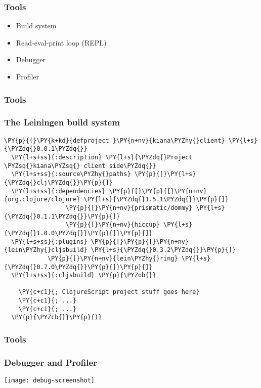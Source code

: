 \begin{frame}
  \frametitle{Tools}


  \begin{itemize}
  \item<1-> Build system
  \item<2-> Read-eval-print loop (REPL)
  \item<3-> Debugger
  \item<4-> Profiler
  \end{itemize}

\end{frame}



\begin{frame}[fragile]
  \frametitle{Tools}
  \frametitle{The Leiningen build system}

\begin{Verbatim}[commandchars=\\\{\}]
\PY{p}{(}\PY{k+kd}{defproject }\PY{n+nv}{kiana\PYZhy{}client} \PY{l+s}{\PYZdq{}0.0.1\PYZdq{}}
  \PY{l+s+ss}{:description} \PY{l+s}{\PYZdq{}Project \PYZsq{}kiana\PYZsq{} client side\PYZdq{}}
  \PY{l+s+ss}{:source\PYZhy{}paths} \PY{p}{[}\PY{l+s}{\PYZdq{}clj\PYZdq{}}\PY{p}{]}
  \PY{l+s+ss}{:dependencies} \PY{p}{[}\PY{p}{[}\PY{n+nv}{org.clojure/clojure} \PY{l+s}{\PYZdq{}1.5.1\PYZdq{}}\PY{p}{]}
                 \PY{p}{[}\PY{n+nv}{prismatic/dommy} \PY{l+s}{\PYZdq{}0.1.1\PYZdq{}}\PY{p}{]}
                 \PY{p}{[}\PY{n+nv}{hiccup} \PY{l+s}{\PYZdq{}1.0.0\PYZdq{}}\PY{p}{]}\PY{p}{]}
  \PY{l+s+ss}{:plugins} \PY{p}{[}\PY{p}{[}\PY{n+nv}{lein\PYZhy{}cljsbuild} \PY{l+s}{\PYZdq{}0.3.2\PYZdq{}}\PY{p}{]}
            \PY{p}{[}\PY{n+nv}{lein\PYZhy{}ring} \PY{l+s}{\PYZdq{}0.7.0\PYZdq{}}\PY{p}{]}\PY{p}{]}
  \PY{l+s+ss}{:cljsbuild} \PY{p}{\PYZob{}}

    \PY{c+c1}{; ClojureScript project stuff goes here}
    \PY{c+c1}{; ...}
    \PY{c+c1}{; ...}
  \PY{p}{\PYZcb{}}\PY{p}{)}
\end{Verbatim}

\end{frame}



\begin{frame}[fragile]
  \frametitle{Tools}
  \frametitle{Debugger and Profiler}

  \begin{center}
      {\texttt{[image: debug-screenshot]}}
  \end{center}

\end{frame}
